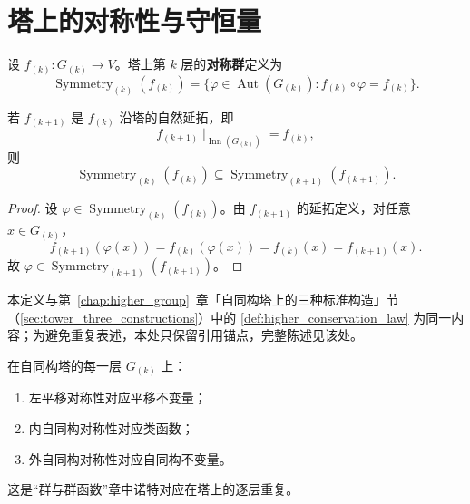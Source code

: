 \section{塔上的对称性与守恒量}

\begin{definition}[塔上的对称群]\label{def:higher_symmetry_group}
设 $f_{(k)}: G_{(k)}\to V$。塔上第 $k$ 层的\textbf{对称群}定义为
\[
\operatorname{Symmetry}_{(k)}(f_{(k)}) = \{\varphi\in\operatorname{Aut}(G_{(k)}) : f_{(k)}\circ\varphi = f_{(k)}\}.
\]
\end{definition}

\begin{proposition}[塔上对称群的包含关系]
\label{prop:higher_symmetry_inclusion}
若 $f_{(k+1)}$ 是 $f_{(k)}$ 沿塔的自然延拓，即
\[
f_{(k+1)}\!\mid_{\operatorname{Inn}(G_{(k)})} = f_{(k)},
\]
则
\[
\operatorname{Symmetry}_{(k)}(f_{(k)})
\subseteq
\operatorname{Symmetry}_{(k+1)}(f_{(k+1)}).
\]
\end{proposition}

\begin{proof}
设 $\varphi\in\operatorname{Symmetry}_{(k)}(f_{(k)})$。由 $f_{(k+1)}$ 的延拓定义，对任意 $x\in G_{(k)}$，
\[
f_{(k+1)}(\varphi(x)) = f_{(k)}(\varphi(x)) = f_{(k)}(x) = f_{(k+1)}(x).
\]
故 $\varphi\in\operatorname{Symmetry}_{(k+1)}(f_{(k+1)})$。
\end{proof}

\begin{definition}[塔上的守恒量]\label{def:higher_conservation_law_2}
本定义与第~\ref{chap:higher_group}~章「自同构塔上的三种标准构造」节（\cref{sec:tower_three_constructions}）中的 \cref{def:higher_conservation_law} 为同一内容；为避免重复表述，本处只保留引用锚点，完整陈述见该处。
\end{definition}

\begin{remark}[塔上的诺特对应]\label{thm:higher_noether}
在自同构塔的每一层 $G_{(k)}$ 上：
\begin{enumerate}[label=(\roman*)]
    \item 左平移对称性对应平移不变量；
    \item 内自同构对称性对应类函数；
    \item 外自同构对称性对应自同构不变量。
\end{enumerate}
这是“群与群函数”章中诺特对应在塔上的逐层重复。
\end{remark}

